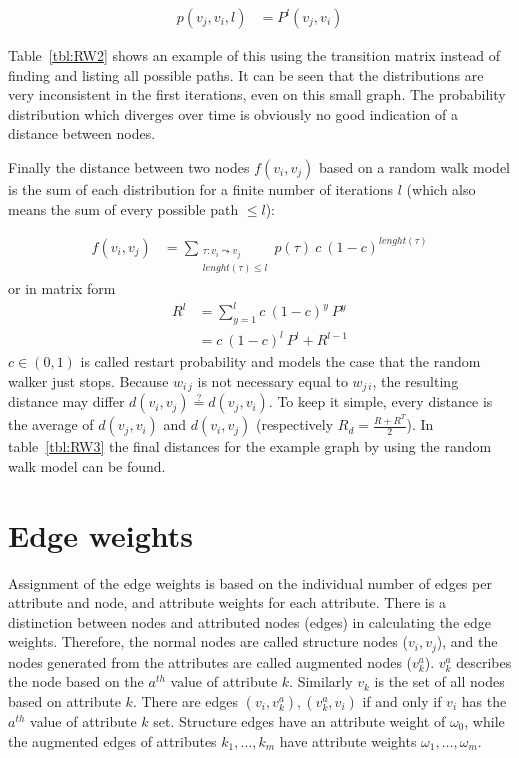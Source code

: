 \begin{align}
p(v_j, v_i, l) &= P^l (v_j, v_i)
\end{align}

Table~\ref{tbl:RW2} shows an example of this using the transition matrix instead of finding and listing all possible paths. It can be seen that the distributions are very inconsistent in the first iterations, even on this small graph. The probability distribution which diverges over time is obviously no good indication of a distance between nodes.

Finally the distance between two nodes $f(v_i, v_j)$ based on a random walk model is the sum of each distribution for a finite number of iterations $l$ (which also means the sum of every possible path $\leq l$):

\begin{align}
f(v_i, v_j) &= \sum_{\substack{\tau: v_i \leadsto v_j\\lenght(\tau) \leq l}} p(\tau) \: c \: (1-c)^{lenght(\tau)}
\end{align}
%
or in matrix form
\begin{align}
R^l &= \sum^{l}_{y=1} c \: (1-c)^y \: P^y\\
		&= c \: (1-c)^l \: P^l + R^{l-1}
\end{align}
%
$c \in (0,1)$ is called restart probability and models the case that the random walker just stops. Because $w_{i\,j}$ is not necessary equal to $w_{j\,i}$, the resulting distance may differ $d(v_i, v_j) \overset{?}{=} d(v_j, v_i)$. To keep it simple, every distance is the average of $d(v_j, v_i)$ and $d(v_i, v_j)$ (respectively $R_d = \frac{R+R^T}{2}$). In table~\ref{tbl:RW3} the final distances for the example graph by using the random walk model can be found.

\section{Edge weights}
Assignment of the edge weights is based on the individual number of edges per attribute and node, and attribute weights for each attribute. There is a distinction between nodes and attributed nodes (edges) in calculating the edge weights. Therefore, the normal nodes are called structure nodes ($v_i, v_j$), and the nodes generated from the attributes are called augmented nodes ($v_k^a$). $v_k^a$ describes the node based on the $a^{th}$ value of attribute $k$. Similarly $v_k$ is the set of all nodes based on attribute $k$. There are edges $(v_i, v_k^a), (v_k^a, v_i)$ if and only if $v_i$ has the $a^{th}$ value of attribute $k$ set. Structure edges have an attribute weight of $\omega_0$, while the augmented edges of attributes $k_1, \dots, k_m$ have attribute weights $\omega_1, \dots, \omega_m$.

